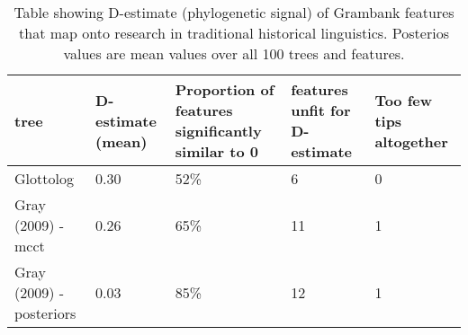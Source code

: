 \begin{table}[ht]
\centering
\begin{tabular}{p{4.5cm}p{2.2cm}p{2.2cm}p{2.2cm}p{2.2cm}}
  \hline
tree & D-estimate (mean) & Proportion of features significantly similar to 0 & features unfit for D-estimate & Too few tips altogether \\ 
  \hline
Glottolog & 0.30 & 52\% & 6 & 0 \\ 
  Gray (2009) - mcct & 0.26 & 65\% & 11 & 1 \\ 
  Gray (2009) - posteriors & 0.03 & 85\% & 12 & 1 \\ 
   \hline
\end{tabular}
\caption{Table showing D-estimate (phylogenetic signal) of Grambank features that map onto research in traditional historical linguistics. Posterios values are mean values over all 100 trees and features.} 
\label{d_estimate_summary}
\end{table}
